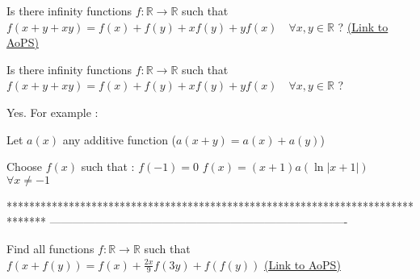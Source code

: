 \begin{problem}
	Is there infinity functions $ f:\mathbb{R} \rightarrow \mathbb{R} $ such that $ f(x+y+xy)=f(x)+f(y)+xf(y)+yf(x) \quad \forall x,y \in \mathbb{R} $ ?
	\flushright \href{https://artofproblemsolving.com/community/c6h554630}{(Link to AoPS)}
\end{problem}



\begin{solution}
	\begin{tcolorbox}Is there infinity functions $ f:\mathbb{R} \rightarrow \mathbb{R} $ such that $ f(x+y+xy)=f(x)+f(y)+xf(y)+yf(x) \quad \forall x,y \in \mathbb{R} $ ?\end{tcolorbox}
Yes. For example :

Let $a(x)$ any additive function ($a(x+y)=a(x)+a(y)$)

Choose $f(x)$ such that :
$f(-1)=0$
$f(x)=(x+1)a(\ln|x+1|)$ $\forall x\ne -1$
\end{solution}
*******************************************************************************
-------------------------------------------------------------------------------

\begin{problem}
	Find all functions  $ f: \mathbb{R}\rightarrow \mathbb{R} $ such that  $f(x+f(y))=f(x)+\frac{2x}{9}f(3y)+f(f(y)) $
	\flushright \href{https://artofproblemsolving.com/community/c6h557461}{(Link to AoPS)}
\end{problem}



